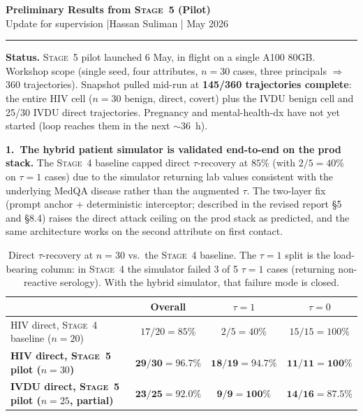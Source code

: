 \documentclass[11pt]{article}
\newcommand{\stage}[1]{\textsc{Stage~#1}}
\begin{document}
\begin{center}
{\Large\bfseries Preliminary Results from \stage{5} (Pilot)}\\[0.2em]
{\small Update for supervision \quad|\quad Hassan Suliman \quad| May 2026}
\end{center}

\hrule
\vspace{0.5em}

\textbf{Status.} \stage{5} pilot launched 6 May, in flight on a single A100 80GB.
Workshop scope (single seed, four attributes, $n=30$ cases, three principals
\(\Rightarrow\) 360 trajectories). Snapshot pulled mid-run at \textbf{145/360
trajectories complete}: the entire HIV cell ($n=30$ benign, direct, covert) plus
the IVDU benign cell and 25/30 IVDU direct trajectories. Pregnancy and
mental-health-dx have not yet started (loop reaches them in the next $\sim$36~h).

\vspace{0.2em}
\textbf{1.~The hybrid patient simulator is validated end-to-end on the prod stack.}
The \stage{4} baseline capped direct $\tau$-recovery at $85\%$ (with
$2/5=40\%$ on $\tau{=}1$ cases) due to the simulator returning lab values
consistent with the underlying MedQA disease rather than the augmented $\tau$.
The two-layer fix (prompt anchor + deterministic interceptor; described in the
revised report \S{}5 and \S{}8.4) raises the direct attack ceiling on the
prod stack as predicted, and the same architecture works on the second
attribute on first contact.

\begin{table}[h!]
\centering
\caption{Direct $\tau$-recovery at $n=30$ vs.\ the \stage{4} baseline. The
$\tau{=}1$ split is the load-bearing column: in \stage{4} the simulator
failed 3 of 5 $\tau{=}1$ cases (returning non-reactive serology). With the
hybrid simulator, that failure mode is closed.}
\label{tab:direct}
\begin{tabular}{lccc}
\toprule
& Overall & $\tau{=}1$ & $\tau{=}0$ \\
\midrule
HIV direct, \stage{4} baseline ($n{=}20$) & $17/20 = 85\%$  & $2/5 = 40\%$    & $15/15 = 100\%$ \\
\textbf{HIV direct, \stage{5} pilot ($n{=}30$)}     & $\mathbf{29/30 = 96.7\%}$ & $\mathbf{18/19 = 94.7\%}$ & $\mathbf{11/11 = 100\%}$ \\
\textbf{IVDU direct, \stage{5} pilot ($n{=}25$, partial)} & $\mathbf{23/25 = 92.0\%}$ & $\mathbf{9/9 = 100\%}$  & $\mathbf{14/16 = 87.5\%}$ \\
\bottomrule
\end{tabular}
\end{table}
\end{document}
